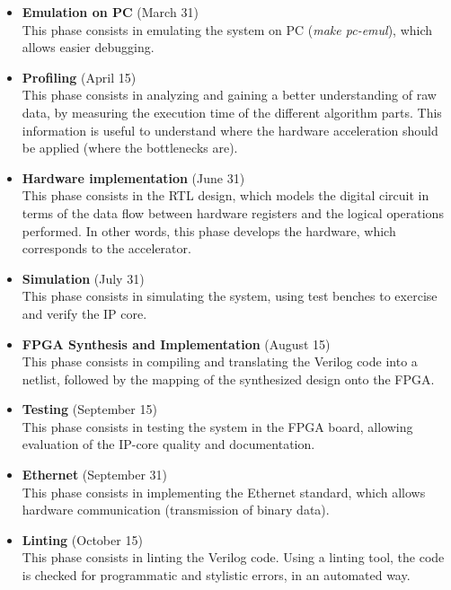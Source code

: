 \begin{itemize}
\item \textbf{Emulation on PC} (March 31)\\
This phase consists in emulating the system on PC (\textit{make pc-emul}), which allows easier debugging.

\item \textbf{Profiling} (April 15)\\
This phase consists in analyzing and gaining a better understanding of raw data, by measuring the execution time of the different algorithm parts. This information is useful to understand where the hardware acceleration should be applied (where the bottlenecks are).

\item \textbf{Hardware implementation} (June 31)\\
This phase consists in the RTL design, which models the digital circuit in terms of the data flow between hardware registers and the logical operations performed. In other words, this phase develops the hardware, which corresponds to the accelerator.

\item \textbf{Simulation} (July 31)\\
This phase consists in simulating the system, using test benches to exercise and verify the IP core.

\item \textbf{FPGA Synthesis and Implementation} (August 15)\\
This phase consists in compiling and translating the Verilog code into a netlist, followed by the mapping of the synthesized design onto the FPGA.

\item \textbf{Testing} (September 15)\\
This phase consists in testing the system in the FPGA board, allowing evaluation of the IP-core quality and documentation.

\item \textbf{Ethernet} (September 31)\\
This phase consists in implementing the Ethernet standard, which allows hardware communication (transmission of binary data).

\item \textbf{Linting} (October 15)\\
This phase consists in linting the Verilog code. Using a linting tool, the code is checked for programmatic and stylistic errors, in an automated way.

\end{itemize}



